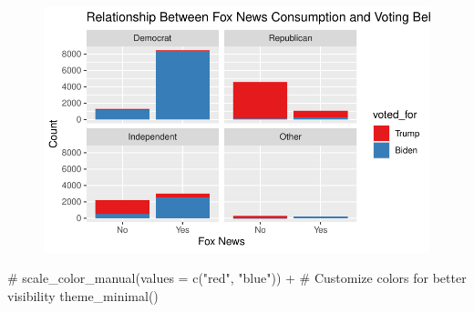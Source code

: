 \documentclass[
  letterpaper,
  DIV=11,
  numbers=noendperiod]{scrartcl}
\newenvironment{Shaded}{\begin{snugshade}}{\end{snugshade}}
\newcommand{\CommentTok}[1]{\textcolor[rgb]{0.37,0.37,0.37}{#1}}
\newcommand{\FunctionTok}[1]{\textcolor[rgb]{0.28,0.35,0.67}{#1}}
\newcommand{\NormalTok}[1]{\textcolor[rgb]{0.00,0.23,0.31}{#1}}
\begin{document}
\begin{figure}[H]

{\centering \includegraphics{paper_files/figure-pdf/unnamed-chunk-9-1.pdf}

}

\end{figure}

\begin{Shaded}
\begin{Highlighting}[]
 \CommentTok{\# scale\_color\_manual(values = c("red", "blue")) +  \# Customize colors for better visibility}
  \FunctionTok{theme\_minimal}\NormalTok{()}
\end{Highlighting}
\end{Shaded}
\end{document}
